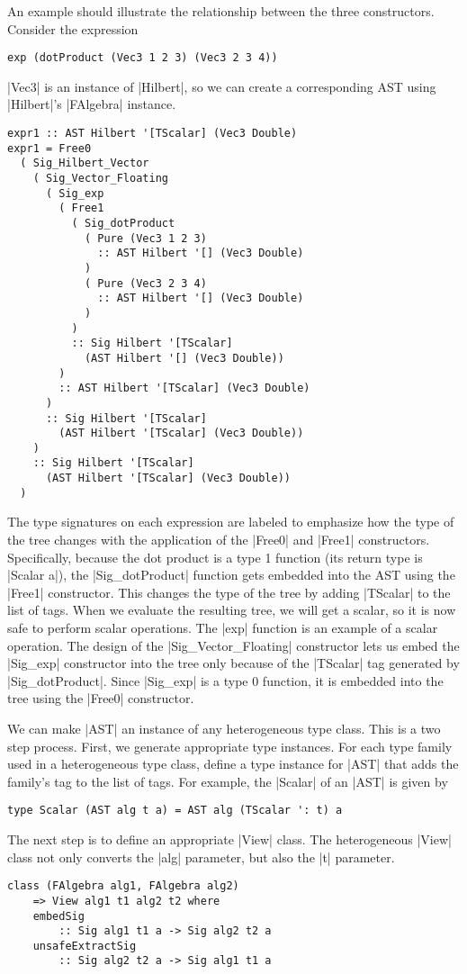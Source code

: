 \documentclass[preprint]{sigplanconf}
\theoremstyle{definition}
\begin{document}
An example should illustrate the relationship between the three constructors.
Consider the expression
\begin{lstlisting}
exp (dotProduct (Vec3 1 2 3) (Vec3 2 3 4))
\end{lstlisting}
|Vec3| is an instance of |Hilbert|, so we can create a corresponding AST using |Hilbert|'s |FAlgebra| instance.
\begin{lstlisting}
expr1 :: AST Hilbert '[TScalar] (Vec3 Double)
expr1 = Free0
  ( Sig_Hilbert_Vector
    ( Sig_Vector_Floating
      ( Sig_exp
        ( Free1
          ( Sig_dotProduct
            ( Pure (Vec3 1 2 3)
              :: AST Hilbert '[] (Vec3 Double)
            )
            ( Pure (Vec3 2 3 4)
              :: AST Hilbert '[] (Vec3 Double)
            )
          )
          :: Sig Hilbert '[TScalar]
            (AST Hilbert '[] (Vec3 Double))
        )
        :: AST Hilbert '[TScalar] (Vec3 Double)
      )
      :: Sig Hilbert '[TScalar]
        (AST Hilbert '[TScalar] (Vec3 Double))
    )
    :: Sig Hilbert '[TScalar]
      (AST Hilbert '[TScalar] (Vec3 Double))
  )
\end{lstlisting}
The type signatures on each expression are labeled to emphasize how the type of the tree changes with the application of the |Free0| and |Free1| constructors.
Specifically, because the dot product is a type 1 function (its return type is |Scalar a|),
the |Sig_dotProduct| function gets embedded into the AST using the |Free1| constructor.
This changes the type of the tree by adding |TScalar| to the list of tags.
When we evaluate the resulting tree, we will get a scalar,
so it is now safe to perform scalar operations.
The |exp| function is an example of a scalar operation.
The design of the |Sig_Vector_Floating| constructor lets us embed the |Sig_exp| constructor into the tree only because of the |TScalar| tag generated by |Sig_dotProduct|.
Since |Sig_exp| is a type 0 function,
it is embedded into the tree using the |Free0| constructor.

We can make |AST| an instance of any heterogeneous type class.
This is a two step process.
First, we generate appropriate type instances.
For each type family used in a heterogeneous type class,
define a type instance for |AST| that adds the family's tag to the list of tags.
For example, the |Scalar| of an |AST| is given by
\begin{lstlisting}
type Scalar (AST alg t a) = AST alg (TScalar ': t) a
\end{lstlisting}

The next step is to define an appropriate |View| class.
The heterogeneous |View| class not only converts the |alg| parameter, but also the |t| parameter.
\begin{lstlisting}
class (FAlgebra alg1, FAlgebra alg2)
    => View alg1 t1 alg2 t2 where
    embedSig
        :: Sig alg1 t1 a -> Sig alg2 t2 a
    unsafeExtractSig
        :: Sig alg2 t2 a -> Sig alg1 t1 a
\end{lstlisting}
\end{document}
